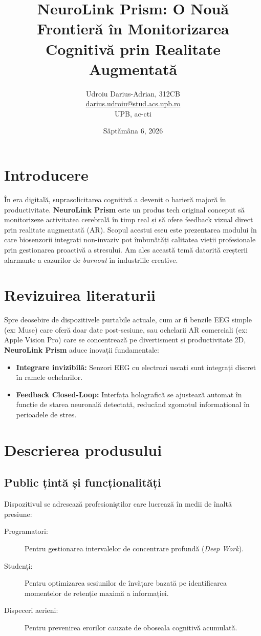 \documentclass[12pt, a4paper]{article}
\title{\textbf{NeuroLink Prism: O Nouă Frontieră în Monitorizarea Cognitivă prin Realitate Augmentată}}
\author{Udroiu Darius-Adrian, 312CB \\ 
\href{mailto:darius.udroiu@stud.acs.upb.ro}{darius.udroiu@stud.acs.upb.ro} \\
UPB, ac-cti}
\date{Săptămâna 6, 2026}
\begin{document}
\maketitle

\renewcommand{\contentsname}{Cuprins}
\tableofcontents
\newpage

\section{Introducere}
În era digitală, suprasolicitarea cognitivă a devenit o barieră majoră în productivitate. \textbf{NeuroLink Prism} este un produs tech original conceput să monitorizeze activitatea cerebrală în timp real și să ofere feedback vizual direct prin realitate augmentată (AR). Scopul acestui eseu este prezentarea modului în care biosenzorii integrați non-invaziv pot îmbunătăți calitatea vieții profesionale prin gestionarea proactivă a stresului. Am ales această temă datorită creșterii alarmante a cazurilor de \textit{burnout} în industriile creative.

\section{Revizuirea literaturii}
Spre deosebire de dispozitivele purtabile actuale, cum ar fi benzile EEG simple (ex: Muse) care oferă doar date post-sesiune, sau ochelarii AR comerciali (ex: Apple Vision Pro) care se concentrează pe divertisment și productivitate 2D, \textbf{NeuroLink Prism} aduce inovații fundamentale:
\begin{itemize}
    \item \textbf{Integrare invizibilă:} Senzori EEG cu electrozi uscați sunt integrați discret în ramele ochelarilor.
    \item \textbf{Feedback Closed-Loop:} Interfața holografică se ajustează automat în funcție de starea neuronală detectată, reducând zgomotul informațional în perioadele de stres.
\end{itemize}

\section{Descrierea produsului}
\subsection{Public țintă și funcționalități}
Dispozitivul se adresează profesioniștilor care lucrează în medii de înaltă presiune:
\begin{description}
    \item[Programatori:] Pentru gestionarea intervalelor de concentrare profundă (\textit{Deep Work}).
    \item[Studenți:] Pentru optimizarea sesiunilor de învățare bazată pe identificarea momentelor de retenție maximă a informației.
    \item[Dispeceri aerieni:] Pentru prevenirea erorilor cauzate de oboseala cognitivă acumulată.
\end{description}
\end{document}
